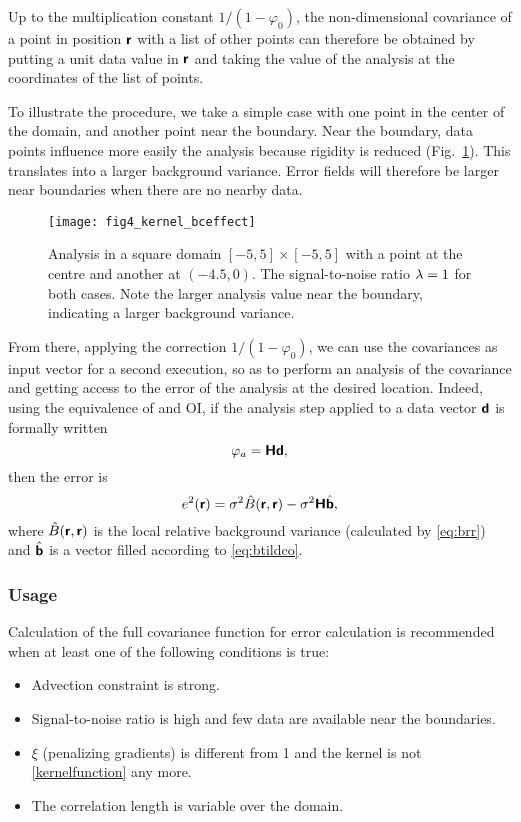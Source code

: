Up to the multiplication constant $1/(1-\varphi_0)$, the non-dimensional covariance of a point in position $\mbox{\boldmath $ \protect\mathsf{r} $}$ with a list of other points can therefore be obtained by putting a unit data value in $\mbox{\boldmath $ \protect\mathsf{r} $}$ and taking the value of the analysis at the coordinates of the list of points. 

To illustrate the procedure, we take a simple case with one point in the center of the domain, and another point near the boundary.
Near the boundary, data points influence more easily the analysis because rigidity is reduced (Fig.~\ref{fig:fig4_kernel_bceffect}). This translates into a larger background variance. Error fields will therefore be larger near boundaries when there are no nearby data.
 
\begin{figure}[htpb]
\centering
\texttt{[image: fig4\_kernel\_bceffect]}
\caption{Analysis in a square domain $[-5,5]\times[-5,5]$ with a point at the centre and another at $(-4.5,0)$. The signal-to-noise ratio $\lambda=1$ for both cases. Note the larger analysis value near the boundary, indicating a larger background variance.
\label{fig:fig4_kernel_bceffect}}
\end{figure} 
 
From there, applying the correction $1/(1-\varphi_0)$, we can use the covariances as input vector for a second \diva execution, so as to perform an analysis of the covariance and getting access to the error of the analysis at the desired location. Indeed, using the equivalence of \diva and OI, if the analysis step applied to a data vector $\mbox{\boldmath $ \protect\mathsf{d} $}$ is formally written 
\begin{equation}
\varphi_a = \mbox{\boldmath $ \protect\mathsf{H} $} \mbox{\boldmath $ \protect\mathsf{d} $},
\end{equation}
then the error is 
\begin{equation}
e^2 (\mbox{\boldmath $ \protect\mathsf{r} $}) = \sigma^2 \hat{B}(\mbox{\boldmath $ \protect\mathsf{r} $},\mbox{\boldmath $ \protect\mathsf{r} $}) - \sigma^2 \mbox{\boldmath $ \protect\mathsf{H} $} \hat{\mbox{\boldmath $ \protect\mathsf{b} $}},
\end{equation}
where $\hat{B}(\mbox{\boldmath $ \protect\mathsf{r} $},\mbox{\boldmath $ \protect\mathsf{r} $})$ is the local relative background variance (calculated by \eqref{eq:brr}) and $\hat{\mbox{\boldmath $ \protect\mathsf{b} $}}$ is a vector filled according to \eqref{eq:btildco}.

\subsubsection{Usage}

Calculation of the full covariance function for error calculation is recommended when at least one of the following conditions is true:
\begin{itemize}
\item Advection constraint is strong.
\item Signal-to-noise ratio is high and few data are available near the boundaries.
\item $\xi$ (penalizing gradients) is different from 1 and the kernel is not \eqref{kernelfunction} any more. 
\item The correlation length is variable over the domain. 
\end{itemize}

